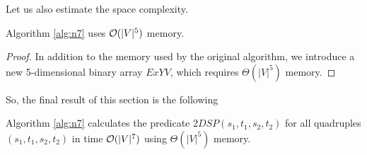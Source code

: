 Let us also estimate the space complexity.

\begin{proposition} \label{n7_m}
Algorithm \ref{alg:n7} uses $\mathcal{O}(|V|^5)$ memory.
\end{proposition}
\begin{proof}
In addition to the memory used by the original algorithm, we introduce a new 5-dimensional binary array $ExYV$, which requires $\Theta(|V|^5)$ memory.
\end{proof}

So, the final result of this section is the following
\begin{theorem}
Algorithm \ref{alg:n7} calculates the predicate $2DSP(s_1, t_1, s_2, t_2)$ for all quadruples $(s_1, t_1, s_2, t_2)$ in time $\mathcal{O}(|V|^7)$ using $\Theta(|V|^5)$ memory. 
\end{theorem}
